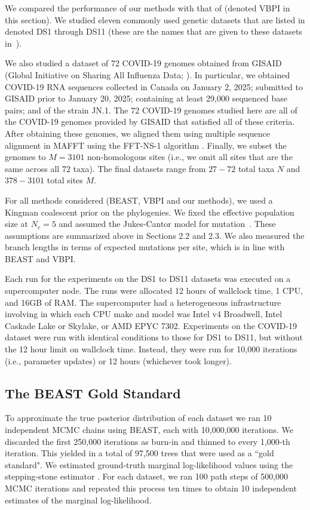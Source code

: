 We compared the performance of our \model methods with that of \citealt{Zhang:2024} (denoted VBPI in this section). We studied eleven commonly used genetic datasets that are listed in \citet{Lakner:2008} denoted DS1 through DS11 (these are the names that are given to these datasets in~\citealt{Lakner:2008}). 

We also studied a dataset of 72 COVID-19 genomes obtained from GISAID (Global Initiative on Sharing All Influenza Data; \citealt{Khare:2021}). In particular, we obtained COVID-19 RNA sequences collected in Canada 
on January 2, 2025; submitted to GISAID prior to January 20, 2025; containing at least 29,000 sequenced base pairs; and of the strain JN.1. The 72 COVID-19 genomes studied here are all of the COVID-19 genomes provided by GISAID that satisfied all of these criteria. 
After obtaining these genomes, we aligned them using multiple sequence alignment in MAFFT using the FFT-NS-1 algorithm \citep{Katoh:2013}. Finally, we subset the genomes to $M = 3101$ non-homologous sites (i.e., we omit all sites that are the same across all 72 taxa). The final datasets range from $27-72$ total taxa $N$ and $378-3101$ total sites $M$.

For all methods considered (BEAST, VBPI and our \model methods), we used a Kingman coalescent prior on the phylogenies. We fixed the effective population size at $N_e = 5$ \citep{Kingman:1982} and assumed the Jukes-Cantor model for mutation~\citep{Jukes:1969}. These assumptions are summarized above in Sections 2.2 and 2.3. We also measured the branch lengths in terms of expected mutations per site, which is in line with BEAST and VBPI.

Each run for the experiments on the DS1 to DS11 datasets was executed on a supercomputer node. The runs were allocated 12 hours of wallclock time, 1 CPU, and 16GB of RAM. The supercomputer had a heterogeneous infrastructure involving in which each CPU make and model was Intel v4 Broadwell, Intel Caskade Lake or Skylake, or AMD EPYC 7302. Experiments on the COVID-19 dataset were run with identical conditions to those for DS1 to DS11, but without the 12 hour limit on wallclock time. Instead, they were run for 10,000 iterations (i.e., parameter updates) or 12 hours (whichever took longer).

\subsection{The BEAST Gold Standard}

To approximate the true posterior distribution of each dataset we ran 10 independent MCMC chains using BEAST, each with 10,000,000 iterations. We discarded the first 250,000 iterations as burn-in and thinned to every 1,000-th iteration. This yielded in a total of 97,500 trees that were used as a ``gold standard". We estimated ground-truth marginal log-likelihood values using the stepping-stone estimator \citep{Xie:2010}. For each dataset, we ran 100 path steps of 500,000 MCMC iterations and repeated this process ten times to obtain 10 independent estimates of the marginal log-likelihood.

